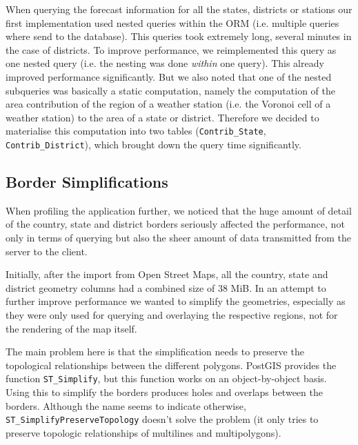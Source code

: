 \documentclass[paper=a4, fontsize=11pt]{article} %
\numberwithin{equation}{section} %
\numberwithin{figure}{section} %
\numberwithin{table}{section} %
\begin{document}
When querying the forecast information for all the states, districts or stations our first implementation used nested queries within the ORM (i.e. multiple queries where send to the database). This queries took extremely long, several minutes in the case of districts. To improve performance, we reimplemented this query as one nested query (i.e. the nesting was done \emph{within} one query). This already improved performance significantly. But we also noted that one of the nested subqueries was basically a static computation, namely the computation of the area contribution of the region of a weather station (i.e. the Voronoi cell of a weather station) to the area of a state or district. Therefore we decided to materialise this computation into two tables (\lstinline{Contrib_State}, \lstinline{Contrib_District}), which brought down the query time significantly.

\subsection{Border Simplifications}

When profiling the application further, we noticed that the huge amount of detail of the country, state and district borders seriously affected the performance, not only in terms of querying but also the sheer amount of data transmitted from the server to the client.

Initially, after the import from Open Street Maps, all the country, state and district geometry columns had a combined size of 38 MiB. In an attempt to further improve performance we wanted to simplify the geometries, especially as they were only used for querying and overlaying the respective regions, not for the rendering of the map itself.

The main problem here is that the simplification needs to preserve the topological relationships between the different polygons. PostGIS provides the function \lstinline{ST_Simplify}, but this function works on an object-by-object basis. Using this to simplify the borders produces holes and overlaps between the borders. Although the name seems to indicate otherwise, \lstinline{ST_SimplifyPreserveTopology} doesn't solve the problem (it only tries to preserve topologic relationships of multilines and multipolygons).
\end{document}
